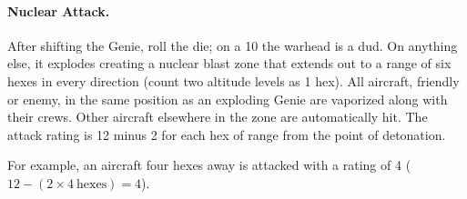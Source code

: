 \begin{advancedrules}
\paragraph{Nuclear Attack.} After shifting the Genie, roll the die; on a 10 the warhead is a dud. On anything else, it explodes creating a nuclear blast zone that extends out to a range of six hexes in every direction (count two altitude levels as 1 hex). All aircraft, friendly or enemy, in the same position as an exploding Genie are vaporized along with their crews. Other aircraft elsewhere in the zone are automatically hit. The attack rating is 12 minus 2 for each hex of range from the point of detonation.

For example, an aircraft four hexes away is attacked with a rating of 4 ($12 - (2 \times 4\ \mathrm{hexes}) = 4$).

\end{advancedrules}
